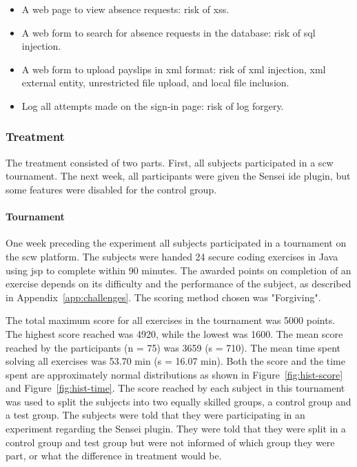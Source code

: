 \begin{itemize}[noitemsep]
    \item A web page to view absence requests: risk of \gls{xss}.
    \item A web form to search for absence requests in the database: risk of \gls{sql} injection.
    \item A web form to upload payslips in \gls{xml} format: risk of \gls{xml} injection, \gls{xml} external entity, unrestricted file upload, and local file inclusion.
    \item Log all attempts made on the sign-in page: risk of log forgery.
\end{itemize}

\subsubsection{Treatment}
The treatment consisted of two parts. First, all subjects participated in a \gls{scw} tournament.
The next week, all participants were given the Sensei \gls{ide} plugin, but some features were disabled for the control group.
\paragraph{Tournament}
One week preceding the experiment all subjects participated in a tournament on the \gls{scw} platform.
The subjects were handed 24 secure coding exercises in Java using \gls{jsp} to complete within 90 minutes.
The awarded points on completion of an exercise depends on its difficulty and the performance of the subject, as described in Appendix~\ref{app:challenges}.
The scoring method chosen was "Forgiving".

The total maximum score for all exercises in the tournament was 5000 points.
The highest score reached was 4920, while the lowest was 1600.
The mean score reached by the participants (n = 75) was 3659 (s = 710).
The mean time spent solving all exercises was 53.70 min (s = 16.07 min).
Both the score and the time spent are approximately normal distributions as shown in Figure~\ref{fig:hist-score} and Figure~\ref{fig:hist-time}.
The score reached by each subject in this tournament was used to split the subjects into two equally skilled groups, a control group and a test group.
The subjects were told that they were participating in an experiment regarding the Sensei plugin.
They were told that they were split in a control group and test group but were not informed of which group they were part, or what the difference in treatment would be. 

